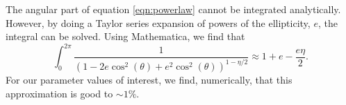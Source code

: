 The angular part of equation \ref{eqn:powerlaw} cannot be integrated analytically. However, by doing a Taylor series expansion of powers of the ellipticity, $e$, the integral can be solved. Using Mathematica, we find that 
\begin{equation}
\int_0^{2 \pi} \frac{1}{ (1 - 2 e \cos^2(\theta) + e^2\cos^2(\theta))^{1 - \eta / 2}} \approx 1 + e  - \frac{ e \eta}{2}.
\end{equation}
For our parameter values of interest, we find, numerically, that this approximation is good to $\sim1\%$. 